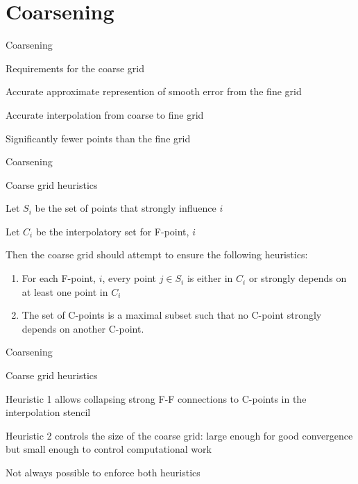 \documentclass[18pt,xcolor=table]{beamer}
\begin{document}

\section{Coarsening}

\begin{frame}{Coarsening}
\begin{block}{Requirements for the coarse grid}
\bit
\item Accurate approximate represention of smooth error from the fine grid
\item Accurate interpolation from coarse to fine grid
\item Significantly fewer points than the fine grid
\eit
\end{block}
\end{frame}

\begin{frame}{Coarsening}
\begin{block}{Coarse grid heuristics}
\bit
\item Let $S_i$ be the set of points that strongly influence $i$
\item Let $C_i$ be the interpolatory set for F-point, $i$
\item Then the coarse grid should attempt to ensure the following heuristics:
\begin{enumerate}
\item For each F-point, $i$, every point $j\in S_i$ is either in $C_i$ or strongly depends on at least one point in $C_i$
\item The set of C-points is a maximal subset such that no C-point strongly depends on another C-point.
\end{enumerate}
\eit
\end{block}
\end{frame}

\begin{frame}{Coarsening}
\begin{block}{Coarse grid heuristics}
\bit
\item Heuristic 1 allows collapsing strong F-F connections to C-points in the interpolation stencil
\item Heuristic 2 controls the size of the coarse grid: large enough for good convergence but small enough to control computational work
\item Not always possible to enforce both heuristics
\eit
\end{block}
\end{frame}
\end{document}
